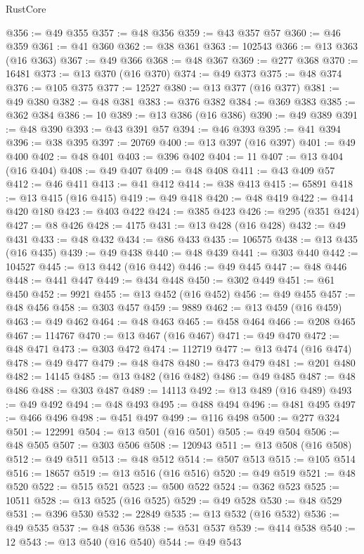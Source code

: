 \begin{lexlean}{RustCore}
\begin{coremodule}
@356 := @49 @355
@357 := @48 @356
@359 := @43 @357 @57
@360 := @46 @359
@361 := @41 @360
@362 := @38 @361
@363 := 102543
@366 := @13 @363 (@16 @363)
@367 := @49 @366
@368 := @48 @367
@369 := @277 @368
@370 := 16481
@373 := @13 @370 (@16 @370)
@374 := @49 @373
@375 := @48 @374
@376 := @105 @375
@377 := 12527
@380 := @13 @377 (@16 @377)
@381 := @49 @380
@382 := @48 @381
@383 := @376 @382
@384 := @369 @383
@385 := @362 @384
@386 := 10
@389 := @13 @386 (@16 @386)
@390 := @49 @389
@391 := @48 @390
@393 := @43 @391 @57
@394 := @46 @393
@395 := @41 @394
@396 := @38 @395
@397 := 20769
@400 := @13 @397 (@16 @397)
@401 := @49 @400
@402 := @48 @401
@403 := @396 @402
@404 := 11
@407 := @13 @404 (@16 @404)
@408 := @49 @407
@409 := @48 @408
@411 := @43 @409 @57
@412 := @46 @411
@413 := @41 @412
@414 := @38 @413
@415 := 65891
@418 := @13 @415 (@16 @415)
@419 := @49 @418
@420 := @48 @419
@422 := @414 @420 @180
@423 := @403 @422
@424 := @385 @423
@426 := @295 (@351 @424)
@427 := @8 @426
@428 := 4175
@431 := @13 @428 (@16 @428)
@432 := @49 @431
@433 := @48 @432
@434 := @86 @433
@435 := 106575
@438 := @13 @435 (@16 @435)
@439 := @49 @438
@440 := @48 @439
@441 := @303 @440
@442 := 104527
@445 := @13 @442 (@16 @442)
@446 := @49 @445
@447 := @48 @446
@448 := @441 @447
@449 := @434 @448
@450 := @302 @449
@451 := @61 @450
@452 := 9921
@455 := @13 @452 (@16 @452)
@456 := @49 @455
@457 := @48 @456
@458 := @303 @457
@459 := 9889
@462 := @13 @459 (@16 @459)
@463 := @49 @462
@464 := @48 @463
@465 := @458 @464
@466 := @208 @465
@467 := 114767
@470 := @13 @467 (@16 @467)
@471 := @49 @470
@472 := @48 @471
@473 := @303 @472
@474 := 112719
@477 := @13 @474 (@16 @474)
@478 := @49 @477
@479 := @48 @478
@480 := @473 @479
@481 := @201 @480
@482 := 14145
@485 := @13 @482 (@16 @482)
@486 := @49 @485
@487 := @48 @486
@488 := @303 @487
@489 := 14113
@492 := @13 @489 (@16 @489)
@493 := @49 @492
@494 := @48 @493
@495 := @488 @494
@496 := @481 @495
@497 := @466 @496
@498 := @451 @497
@499 := @116 @498
@500 := @277 @324
@501 := 122991
@504 := @13 @501 (@16 @501)
@505 := @49 @504
@506 := @48 @505
@507 := @303 @506
@508 := 120943
@511 := @13 @508 (@16 @508)
@512 := @49 @511
@513 := @48 @512
@514 := @507 @513
@515 := @105 @514
@516 := 18657
@519 := @13 @516 (@16 @516)
@520 := @49 @519
@521 := @48 @520
@522 := @515 @521
@523 := @500 @522
@524 := @362 @523
@525 := 10511
@528 := @13 @525 (@16 @525)
@529 := @49 @528
@530 := @48 @529
@531 := @396 @530
@532 := 22849
@535 := @13 @532 (@16 @532)
@536 := @49 @535
@537 := @48 @536
@538 := @531 @537
@539 := @414 @538
@540 := 12
@543 := @13 @540 (@16 @540)
@544 := @49 @543

\end{coremodule}
\end{lexlean}
